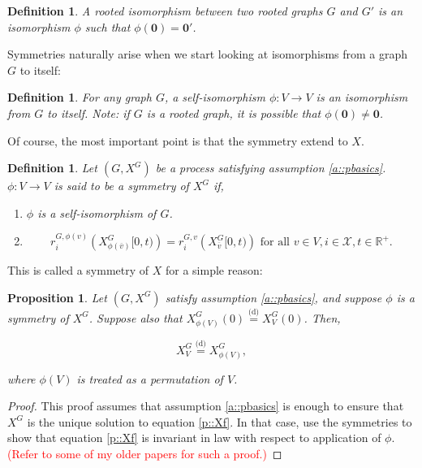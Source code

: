\documentclass[12pt]{article}
\newcommand{\mb}{\mathbb}
\newcommand{\mc}{\mathcal}
\newcommand{\ra}{\rightarrow}
\newcommand{\ov}{\overline}
\newcommand{\te}{\text}
\newcommand{\tr}{\textcolor{red}}
\newcommand{\deq}{\overset{\text{(d)}}{=}}			%
\newcommand{\sta}{\mc{X}}							%
\newcommand{\cl}[1]{\ov{#1}}						%
\renewcommand{\root}{\mathbf{0}}
\newcommand{\Xf}{X}									%
\newcommand{\rate}{r}								%
\newcommand{\vind}[1]{_{#1}}						%
\newcommand{\tme}[1]{(#1)}							%
\newcommand{\tmi}[1]{#1}							%
\newcommand{\gind}[1]{^{#1}}						%
\newcommand{\stpara}[1]{_{#1}}						%
\newcommand{\gvpara}[2]{^{#1,#2}}					%
\newtheorem{prop}[thms]{Proposition}
\newtheorem{defn}[thms]{Definition}
\begin{document}
\begin{defn}
A rooted isomorphism between two rooted graphs \(G\) and \(G'\) is an isomorphism \(\phi\) such that \(\phi(\root) = \root'\).
\label{a::riso}
\end{defn}

Symmetries naturally arise when we start looking at isomorphisms from a graph \(G\) to itself:

\begin{defn}
For any graph \(G\), a self-isomorphism \(\phi: V \ra V\) is an isomorphism from \(G\) to itself. Note: if \(G\) is a rooted graph, it is possible that \(\phi(\root) \neq \root\).
\label{a:siso}
\end{defn}

Of course, the most important point is that the symmetry extend to \(\Xf\).

\begin{defn}
Let \((G,\Xf\gind{G})\) be a process satisfying assumption \ref{a::pbasics}. \(\phi: V \ra V\) is said to be a symmetry of \(\Xf\gind{G}\) if,

\begin{enumerate}
\item \(\phi\) is a self-isomorphism of \(G\).

\item 

\begin{equation}
\rate\gvpara{G}{\phi(v)}\stpara{i}\left(\Xf\gind{G}\vind{\phi(\cl{v})}\tmi{[0,t)}\right) = \rate\gvpara{G}{v}\stpara{i}\left(\Xf\gind{G}\vind{\cl{v}}\tmi{[0,t)}\right) \te{ for all } v \in V,i \in \sta, t \in \mb{R}^+.
\end{equation}
\end{enumerate}
\label{a:Xsim}
\end{defn}

This is called a symmetry of \(\Xf\) for a simple reason:

\begin{prop}
Let \((G,\Xf\gind{G})\) satisfy assumption \ref{a::pbasics}, and suppose \(\phi\) is a symmetry of \(\Xf\gind{G}\). Suppose also that \(\Xf\gind{G}\vind{\phi(V)}\tme{0} \deq \Xf\gind{G}\vind{V}\tme{0}\). Then,

\[\Xf\gind{G}\vind{V} \deq \Xf\gind{G}\vind{\phi(V)},\]

where \(\phi(V)\) is treated as a permutation of \(V\).
\label{a::simprop}
\end{prop}
\begin{proof}
This proof assumes that assumption \ref{a::pbasics} is enough to ensure that \(\Xf\gind{G}\) is the unique solution to equation \eqref{p::Xf}. In that case, use the symmetries to show that equation \eqref{p::Xf} is invariant in law with respect to application of \(\phi\). \tr{(Refer to some of my older papers for such a proof.)}
\end{proof}
\end{document}
